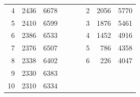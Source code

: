 \begin{enumerate}
\begin{table}[h!]
{\begin{tabular}{|rrr|rrrrrr}
					\multicolumn{1}{|r|}{4}     & \multicolumn{1}{r|}{2436}            & 6678                                                 &                      &                      & \multicolumn{1}{r|}{} & \multicolumn{1}{r|}{2}     & \multicolumn{1}{r|}{2056}            & \multicolumn{1}{r|}{5770}                            \\ \cline{1-3} \cline{7-9} 
					\multicolumn{1}{|r|}{5}     & \multicolumn{1}{r|}{2410}            & 6599                                                 &                      &                      & \multicolumn{1}{r|}{} & \multicolumn{1}{r|}{3}     & \multicolumn{1}{r|}{1876}            & \multicolumn{1}{r|}{5461}                            \\ \cline{1-3} \cline{7-9} 
					\multicolumn{1}{|r|}{6}     & \multicolumn{1}{r|}{2386}            & 6533                                                 &                      &                      & \multicolumn{1}{r|}{} & \multicolumn{1}{r|}{4}     & \multicolumn{1}{r|}{1452}            & \multicolumn{1}{r|}{4916}                            \\ \cline{1-3} \cline{7-9} 
					\multicolumn{1}{|r|}{7}     & \multicolumn{1}{r|}{2376}            & 6507                                                 &                      &                      & \multicolumn{1}{r|}{} & \multicolumn{1}{r|}{5}     & \multicolumn{1}{r|}{786}             & \multicolumn{1}{r|}{4358}                            \\ \cline{1-3} \cline{7-9} 
					\multicolumn{1}{|r|}{8}     & \multicolumn{1}{r|}{2338}            & 6402                                                 &                      &                      & \multicolumn{1}{r|}{} & \multicolumn{1}{r|}{6}     & \multicolumn{1}{r|}{226}             & \multicolumn{1}{r|}{4047}                            \\ \cline{1-3} \cline{7-9} 
					\multicolumn{1}{|r|}{9}     & \multicolumn{1}{r|}{2330}            & 6383                                                 &                      &                      &                       &                            &                                      &                                                      \\ \cline{1-3}
					\multicolumn{1}{|r|}{10}    & \multicolumn{1}{r|}{2310}            & 6334                                                 &                      &                      &                       &                            &                                      &                                                      \\ \cline{1-3}

\end{tabular}}
\end{table}
\end{enumerate}
